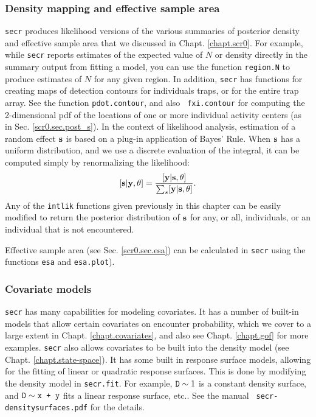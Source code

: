 \subsubsection{Density mapping and effective sample area}
\mbox{\tt secr} produces likelihood versions of the various summaries
of posterior density and effective sample area that we discussed in
Chapt. \ref{chapt.scr0}. For example, while \mbox{\tt secr} reports
estimates of the expected value of $N$ or density directly in the
summary output from fitting a model, you can use the function
\mbox{\tt region.N} to produce estimates of $N$ for any given region.
In addition, \mbox{\tt secr} has functions for creating maps of
detection contours for individuals traps, or for the entire trap
array. See the function \mbox{\tt pdot.contour}, and also \mbox{\tt
  fxi.contour} for computing the 2-dimensional pdf of the locations of
one or more individual activity centers (as in
Sec. \ref{scr0.sec.post_s}). In the context of likelihood analysis,
estimation of a random effect ${\bf s}$ is based on a plug-in
application of Bayes' Rule.  When ${\bf s}$ has a uniform
distribution, and we use a discrete evaluation of the integral, it can
be computed simply by renormalizing the likelihood:
\[
 [{\bf s}| {\bf y},\theta] = \frac{ [{\bf y} | {\bf s},\theta]  }{ \sum_{s} [{\bf y} | {\bf s},\theta]  }.
\]
Any of the \mbox{\tt intlik} functions given previously in this
chapter can be easily modified to return the posterior distribution of
${\bf s}$ for 
any, or all, individuals, or an individual that is not encountered. 

Effective sample area
(see Sec. \ref{scr0.sec.esa}) 
 can be calculated in
\mbox{\tt secr} 
using the functions
\mbox{\tt esa} and \mbox{\tt esa.plot}). 

\subsubsection{Covariate models}
\mbox{\tt secr} has many capabilities for modeling 
covariates. It has a number of built-in models that allow certain
covariates on encounter probability, which we cover to a large
extent in
 Chapt. \ref{chapt.covariates}, and also see
Chapt. \ref{chapt.gof} for more examples. 
\mbox{\tt secr} also allows covariates to be built into the density
model (see Chapt. \ref{chapt.state-space}).  It has some built in
response surface models, allowing for the fitting of linear or
quadratic response surfaces. This is done by modifying the density
model in \mbox{\tt secr.fit}. For example, $\mbox{\tt D} \sim 1$ is a
constant density surface, and $\mbox{\tt D} \sim \mbox{\tt x + y}$
fits a linear response surface, etc..  See the manual \mbox{\tt
  secr-densitysurfaces.pdf} for the details.

